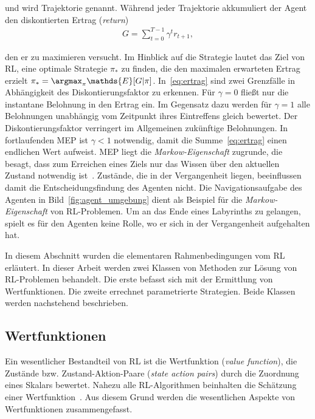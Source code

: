 und wird Trajektorie genannt. Während jeder Trajektorie akkumuliert der Agent den diskontierten Ertrag (\textit{return})
\begin{align}
G = \sum_{t=0}^{T-1} \gamma^t r_{t+1},
\label{eq:ertrag}
\end{align}

den er zu maximieren versucht. Im Hinblick auf die Strategie lautet das Ziel von RL, eine optimale Strategie $\pi_*$ zu finden, die den maximalen erwarteten Ertrag erzielt $\pi_* = \argmax_\pi \mathds{E}[G|\pi]$.
In~\eqref{eq:ertrag} sind zwei Grenzfälle in Abhängigkeit des Diskontierungsfaktor zu erkennen. Für $\gamma=0$ fließt nur die instantane Belohnung in den Ertrag ein. Im Gegensatz dazu werden für $\gamma = 1$ alle Belohnungen unabhängig vom Zeitpunkt ihres Eintreffens gleich bewertet. Der Diskontierungsfaktor verringert im Allgemeinen zukünftige Belohnungen. In fortlaufenden MEP ist $\gamma < 1$ notwendig, damit die Summe~\eqref{eq:ertrag} einen endlichen Wert aufweist. 
MEP liegt die \textit{Markow-Eigenschaft} zugrunde, die besagt, dass zum Erreichen eines Ziels nur das Wissen über den aktuellen Zustand notwendig ist~\cite{SB98}. Zustände, die in der Vergangenheit liegen, beeinflussen damit die Entscheidungsfindung des Agenten nicht. Die Navigationsaufgabe des Agenten in Bild~\ref{fig:agent_umgebung} dient als Beispiel für die \textit{Markow-Eigenschaft} von RL-Problemen. Um an das Ende eines Labyrinths zu gelangen, spielt es für den Agenten keine Rolle, wo er sich in der Vergangenheit aufgehalten hat. \newline

In diesem Abschnitt wurden die elementaren Rahmenbedingungen vom RL erläutert. In dieser Arbeit werden zwei Klassen von Methoden zur Lösung von RL-Problemen behandelt. Die erste befasst sich mit der Ermittlung von Wertfunktionen. Die zweite errechnet parametrierte Strategien. Beide Klassen werden nachstehend beschrieben.






\subsection{Wertfunktionen}
\label{subsec:wertfunktionen}

Ein wesentlicher Bestandteil von RL ist die Wertfunktion (\textit{value function}), die Zustände bzw. Zustand-Aktion-Paare (\textit{state action pairs}) durch die Zuordnung eines Skalars bewertet. Nahezu alle RL-Algorithmen beinhalten die Schätzung einer Wertfunktion~\cite{SB98}. Aus diesem Grund werden die wesentlichen Aspekte von Wertfunktionen zusammengefasst. \newline

